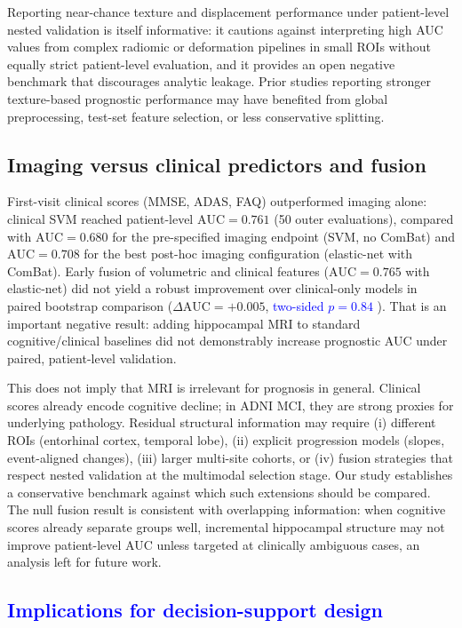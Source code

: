 \documentclass[review]{elsarticle}
\newcommand{\corrigir}[2]{%
	\textcolor{red}{\sout{#1}} %
	\textcolor{blue}{#2}%
}
\begin{document}
	Reporting near-chance texture and displacement performance under patient-level nested validation is itself informative: it cautions against interpreting high AUC values from complex radiomic or deformation pipelines in small ROIs without equally strict patient-level evaluation, and it provides an open negative benchmark that discourages analytic leakage. Prior studies reporting stronger texture-based prognostic performance may have benefited from global preprocessing, test-set feature selection, or less conservative splitting.
	
	\subsection{Imaging versus clinical predictors and fusion}
	
	First-visit clinical scores (MMSE, ADAS, FAQ) outperformed imaging alone: clinical SVM reached patient-level $\mathrm{AUC}=0.761$ (50 outer evaluations), compared with $\mathrm{AUC}=0.680$ for the pre-specified imaging endpoint (SVM, no ComBat) and $\mathrm{AUC}=0.708$ for the best post-hoc imaging configuration (elastic-net with ComBat). Early fusion of volumetric and clinical features ($\mathrm{AUC}=0.765$ with elastic-net) did not yield a robust improvement over clinical-only models in paired bootstrap comparison ($\Delta\mathrm{AUC}=+0.005$, \corrigir{}{two-sided $p=0.84$}). That is an important negative result: adding hippocampal MRI to standard cognitive/clinical baselines did not demonstrably increase prognostic AUC under paired, patient-level validation.
	
	This does not imply that MRI is irrelevant for prognosis in general. Clinical scores already encode cognitive decline; in ADNI MCI, they are strong proxies for underlying pathology. Residual structural information may require (i) different ROIs (entorhinal cortex, temporal lobe), (ii) explicit progression models (slopes, event-aligned changes), (iii) larger multi-site cohorts, or (iv) fusion strategies that respect nested validation at the multimodal selection stage. Our study establishes a conservative benchmark against which such extensions should be compared. The null fusion result is consistent with overlapping information: when cognitive scores already separate groups well, incremental hippocampal structure may not improve patient-level AUC unless targeted at clinically ambiguous cases, an analysis left for future work.
	
	\subsection{\corrigir{}{Implications for decision-support design}}
	
\end{document}
